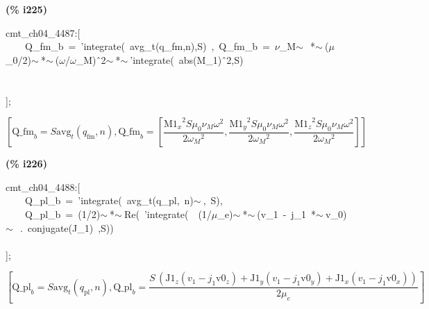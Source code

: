 \documentclass[fleqn]{article}
\begin{document}
\noindent
\begin{minipage}[t]{4.000000em}\color{red}\bfseries
(\% i225)	
\end{minipage}
\begin{minipage}[t]{\textwidth}\color{blue}
cmt\_ch04\_4487:[\\
\ \ \ \ Q\_fm\_b\ =\ 'integrate(\ avg\_t(q\_fm,n),S)\ ,\ Q\_fm\_b\ =\ \ensuremath{\nu}\_M\ensuremath{\sim\ }\ *\ensuremath{\sim\ }(\ensuremath{\mu}\_0/2)\ensuremath{\sim\ }*\ensuremath{\sim\ }(\ensuremath{\omega}/\ensuremath{\omega}\_M)\^\ 2\ensuremath{\sim\ }*\ensuremath{\sim\ }'integrate(\ abs(M\_1)\^\ 2,S)\\
\\
\\
];
\end{minipage}
\[\displaystyle \tag{\% o225} 
\left[ {{\ensuremath{\mathrm{Q\_ fm}}}_b}=S {{\ensuremath{\mathrm{avg}}}_t}\left( {q_{\ensuremath{\mathrm{fm}}}}\operatorname{,}n\right) \operatorname{,}{{\ensuremath{\mathrm{Q\_ fm}}}_b}=\left[ \frac{{{{{\ensuremath{\mathrm{M1}}}_x}}^{2}} S {{\mu }_0} {{\nu }_M} {{\omega }^{2}}}{2 {{{{\omega }_M}}^{2}}}\operatorname{,}\frac{{{{{\ensuremath{\mathrm{M1}}}_y}}^{2}} S {{\mu }_0} {{\nu }_M} {{\omega }^{2}}}{2 {{{{\omega }_M}}^{2}}}\operatorname{,}\frac{{{{{\ensuremath{\mathrm{M1}}}_z}}^{2}} S {{\mu }_0} {{\nu }_M} {{\omega }^{2}}}{2 {{{{\omega }_M}}^{2}}}\right] \right] \mbox{}
\]


\noindent
\begin{minipage}[t]{4.000000em}\color{red}\bfseries
(\% i226)	
\end{minipage}
\begin{minipage}[t]{\textwidth}\color{blue}
cmt\_ch04\_4488:[\\
\ \ \ \ Q\_pl\_b\ =\ 'integrate(\ avg\_t(q\_pl,\ n)\ensuremath{\sim\ },\ S),\\
\ \ \ \ Q\_pl\_b\ =\ (1/2)\ensuremath{\sim\ }*\ensuremath{\sim\ }Re(\ 'integrate(\ \ (1/\ensuremath{\mu}\_e)\ensuremath{\sim\ }*\ensuremath{\sim\ }(v\_1\ -\ j\_1\ *\ensuremath{\sim\ }v\_0)\ensuremath{\sim\ }\ .\ conjugate(J\_1)\ ,S))\ \ \\
\\
];
\end{minipage}
\[\displaystyle \tag{\% o226} 
\left[ {{\ensuremath{\mathrm{Q\_ pl}}}_b}=S {{\ensuremath{\mathrm{avg}}}_t}\left( {q_{\ensuremath{\mathrm{pl}}}}\operatorname{,}n\right) \operatorname{,}{{\ensuremath{\mathrm{Q\_ pl}}}_b}=\frac{S\, \left( {{\ensuremath{\mathrm{J1}}}_z} \left( {v_1}-{j_1} {{\ensuremath{\mathrm{v0}}}_z}\right) +{{\ensuremath{\mathrm{J1}}}_y} \left( {v_1}-{j_1} {{\ensuremath{\mathrm{v0}}}_y}\right) +{{\ensuremath{\mathrm{J1}}}_x} \left( {v_1}-{j_1} {{\ensuremath{\mathrm{v0}}}_x}\right) \right) }{2 {{\mu }_e}}\right] \mbox{}
\]
\end{document}
